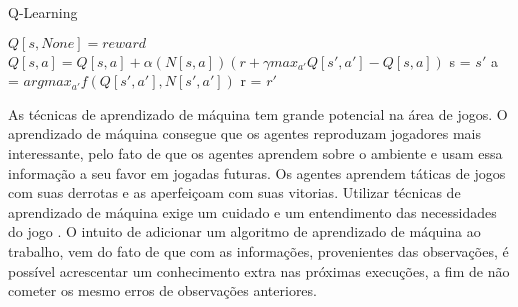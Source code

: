 \begin{algorithm}
	\caption{Q-Learning}
	\label{alg:qlearning}
	\begin{algorithmic}[]	
		\State	\Return $Q[s, None] = reward$
		\EndIf
		\State $Q[s, a] = Q[s, a] + \alpha(N[s, a]) (r + \gamma max_{a'} Q[s', a'] - Q[s, a])$
		\State s = $s'$
		\State a = $argmax_{a'} f(Q[s', a'], N[s', a'])$
		\State r = $r'$
		\EndIf	
		\EndFunction
	\end{algorithmic}
\end{algorithm}



As técnicas de aprendizado de máquina tem grande potencial na área de jogos. O aprendizado de máquina consegue que os agentes reproduzam jogadores mais interessante, pelo fato de que os agentes aprendem sobre o ambiente e usam essa informação a seu favor em jogadas futuras. Os agentes aprendem táticas de jogos com suas derrotas e as aperfeiçoam com suas vitorias. Utilizar técnicas de aprendizado de máquina exige um cuidado e um entendimento das necessidades do jogo \cite{millington2009artificial}. O intuito de adicionar um algoritmo de aprendizado de máquina ao trabalho, vem do fato de que com as informações, provenientes das observações, é possível acrescentar um conhecimento extra nas próximas execuções, a fim de não cometer os mesmo erros de observações anteriores. 